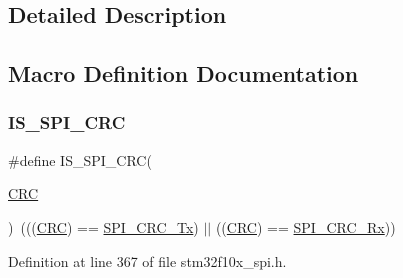 \subsection{Detailed Description}


\subsection{Macro Definition Documentation}
\mbox{\label{group___s_p_i___c_r_c___transmit___receive_ga31fe242594f851558496a93f85def883}} 
\subsubsection{\texorpdfstring{I\+S\+\_\+\+S\+P\+I\+\_\+\+C\+RC}{IS\_SPI\_CRC}}
{\footnotesize\ttfamily \#define I\+S\+\_\+\+S\+P\+I\+\_\+\+C\+RC(\begin{DoxyParamCaption}\item[{}]{\hyperlink{group___peripheral__declaration_ga4381bb54c2dbc34500521165aa7b89b1}{C\+RC} }\end{DoxyParamCaption})~(((\hyperlink{group___peripheral__declaration_ga4381bb54c2dbc34500521165aa7b89b1}{C\+RC}) == \hyperlink{group___s_p_i___c_r_c___transmit___receive_ga7b5cd97c9323e491b628fd3a7be9e133}{S\+P\+I\+\_\+\+C\+R\+C\+\_\+\+Tx}) $\vert$$\vert$ ((\hyperlink{group___peripheral__declaration_ga4381bb54c2dbc34500521165aa7b89b1}{C\+RC}) == \hyperlink{group___s_p_i___c_r_c___transmit___receive_gaf68380273616efbbc2dc9a420f1c641b}{S\+P\+I\+\_\+\+C\+R\+C\+\_\+\+Rx}))}



Definition at line 367 of file stm32f10x\+\_\+spi.\+h.

\mbox{\label{group___s_p_i___c_r_c___transmit___receive_gaf68380273616efbbc2dc9a420f1c641b}} 
